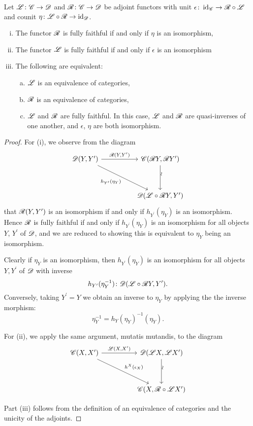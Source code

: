 \documentclass[10pt]{amsart}
\begin{document}
\begin{prop}
  Let $\mathscr{L} \colon \mathscr{C} \to \mathscr{D}$ and $\mathscr{R} \colon \mathscr{C} \to \mathscr{D}$ be adjoint functors with unit $\epsilon \colon \operatorname{id}_{\mathscr{C}} \to \mathscr{R} \circ \mathscr{L}$ and counit $\eta \colon \mathscr{L} \circ \mathscr{R} \to \operatorname{id}_{\mathscr{D}}$.
  \begin{enumerate}[(i)]
  \item
    The functor $\mathscr{R}$ is fully faithful if and only if $\eta$ is an isomorphism,
  \item
    The functor $\mathscr{L}$ is fully faithful if and only if $\epsilon$ is an isomorphism
  \item
    The following are equivalent:
    \begin{enumerate}[(a)]
    \item
      $\mathscr{L}$ is an equivalence of categories,
    \item
      $\mathscr{R}$ is an equivalence of categories,
    \item
      $\mathscr{L}$ and $\mathscr{R}$ are fully faithful.
      In this case, $\mathscr{L}$ and $\mathscr{R}$ are quasi-inverses of one another, and $\epsilon$, $\eta$ are both isomorphism.
    \end{enumerate}
  \end{enumerate}
  
  \begin{proof}
    For (i), we observe from the diagram
    $$\begin{tikzcd}
      \D(Y, Y^\prime) \arrow[swap]{rrdd}{h_{Y^\prime}(\eta_Y)}\arrow{rr}{\RA(Y,Y^\prime)} && \C(\RA Y, \RA Y^\prime)\arrow{dd}[rotate=90,yshift=-0.5 ex]{\sim}\\
      \\
      && \D(\LA \circ \RA Y, Y^\prime)
    \end{tikzcd}$$
    that $\mathscr{R}(Y,Y^\prime)$ is an isomorphism if and only if $h_{Y^\prime}(\eta_Y)$ is an isomorphism.
    Hence $\mathscr{R}$ is fully faithful if and only if $h_{Y^\prime}(\eta_Y)$ is an isomorphism for all objects $Y$, $Y^\prime$ of $\mathscr{D}$, and we are reduced to showing this is equivalent to $\eta_Y$ being an isomorphism.
    
    Clearly if $\eta_Y$ is an isomorphism, then $h_{Y^\prime}(\eta_Y)$ is an isomorphism for all objects $Y, Y^\prime$ of $\mathscr{D}$ with inverse
    $$h_{Y^\prime}(\eta_Y^{-1}) \colon \mathscr{D}(\mathscr{L} \circ \mathscr{R} Y, Y^\prime).$$
    Conversely, taking $Y^\prime = Y$ we obtain an inverse to $\eta_Y$ by applying the the inverse morphism:
    $$\eta_Y^{-1} = h_{Y}(\eta_Y)^{-1}(\eta_Y).$$
    
    For (ii), we apply the same argument, mutatis mutandis, to the diagram
    $$\begin{tikzcd}
      \C(X,X^\prime) \arrow{rrdd}{h^X(\epsilon_X)}\arrow{rr}{\LA(X,X^\prime)} && \D(\LA X, \LA X^\prime)\arrow{dd}[rotate=90,yshift=-.5ex]{\sim}\\
      \\
      && \C(X, \RA \circ \LA X^\prime)
    \end{tikzcd}$$
    
    Part (iii) follows from the definition of an equivalence of categories and the unicity of the adjoints.
  \end{proof}
\end{prop}
\end{document}
